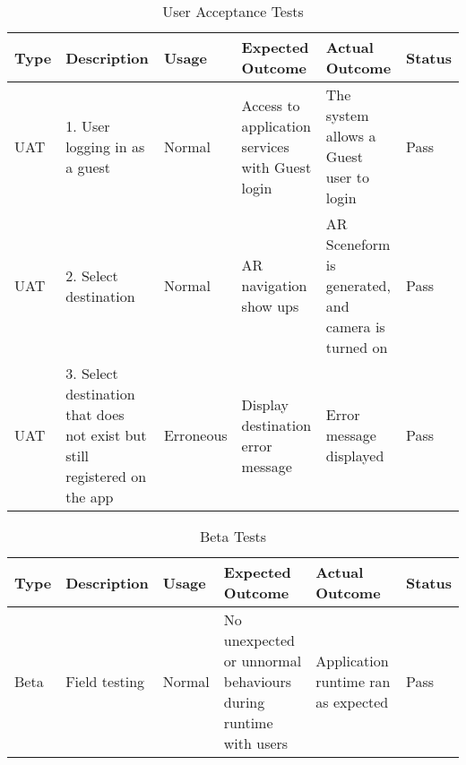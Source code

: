 \begin{sidewaystable}
\begin{table}[H]
\begin{tabular}{|p{2cm}|p{5cm}|l|p{5cm}|p{5cm}|l|}
\toprule
\textbf{Type}   & \textbf{Description}                                                      & \textbf{Usage} & \textbf{Expected Outcome}                                           & \textbf{Actual Outcome}                                            & \textbf{Status} \\ \hline
UAT & 1. User logging in as a guest                                             & Normal         & Access to application services with Guest login                     & The system allows a Guest user  to login                           & Pass            \\ \hline
UAT & 2. Select destination                                                     & Normal         & AR navigation show ups                                              & AR Sceneform is generated, and camera is turned on                         & Pass            \\ \hline
UAT & 3. Select destination that does not exist but still registered on the app & Erroneous      & Display destination error message                                   & Error message displayed                                                   & Pass            \\
\bottomrule
\end{tabular}
\caption{User Acceptance Tests}
\label{table:uatests}
\end{table}

\begin{table}[H]
\begin{tabular}{|p{2cm}|p{5cm}|l|p{5cm}|p{5cm}|l|}
\toprule
\textbf{Type} & \textbf{Description} & \textbf{Usage} & \textbf{Expected Outcome}                                      & \textbf{Actual Outcome}             & \textbf{Status} \\ \hline
Beta          & Field testing        & Normal         & No unexpected or unnormal behaviours during runtime with users & Application runtime ran as expected & Pass            \\
\bottomrule
\end{tabular}
\caption{Beta Tests}
\label{table:betatests}
\end{table}

\end{sidewaystable}